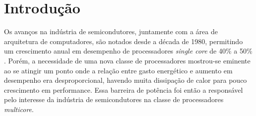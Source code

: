 
\newcommand{\multicore}{\textit{multicore}\xspace}
\newcommand{\chip}{\textit{chip}\xspace}
\newcommand{\chips}{\textit{chips}\xspace}
\newcommand{\singlecore}{\textit{single core}\xspace}
\newcommand{\tradeoff}{\textit{trade-off}\xspace}
\newcommand{\exascale}{\textit{Exascale}\xspace}
\newcommand{\greencomputing}{\textit{Green Computing}\xspace}  
\newcommand{\ranking}{\textit{ranking}\xspace}
\newcommand{\benchs}{\textit{benchmarks}\xspace}
\newcommand{\etal}{\textit{et al}.\xspace}
\newcommand{\thread}{\textit{thread}\xspace}
\newcommand{\threads}{\textit{threads}\xspace}
\newcommand{\cache}{\textit{cache}\xspace}
\newcommand{\caches}{\textit{caches}\xspace}
\newcommand{\byte}{\textit{byte}\xspace}
\newcommand{\bytes}{\textit{bytes}\xspace}
\newcommand{\transistor}{\textit{transistor}\xspace}
\newcommand{\transistors}{\textit{transistors}\xspace}
\newcommand{\hardware}{\textit{hardware}\xspace}
\newcommand{\cluster}{\textit{cluster}\xspace}
\newcommand{\clusters}{\textit{clusters}\xspace}
\newcommand{\kernel}{\textit{kernel}\xspace}
\newcommand{\kernels}{\textit{kernels}\xspace}
\newcommand{\offset}{\textit{offset}\xspace}
\newcommand{\offsets}{\textit{offsets}\xspace}
\newcommand{\master}{\textit{master}\xspace}
\newcommand{\masters}{\textit{masters}\xspace}
\newcommand{\slave}{\textit{slave}\xspace}
\newcommand{\slaves}{\textit{slaves}\xspace}

\chapter{Introdução}
\label{ch:introdução}

Os avanços na indústria de semicondutores, juntamente com a área de arquitetura de computadores, são notados desde a década de 1980, permitindo um crescimento anual em desempenho de processadores \singlecore de 40\% a 50\% \cite{Larus2008}. Porém, a necessidade de uma nova classe de processadores mostrou-se eminente ao se atingir um ponto onde a relação entre gasto energético e aumento em desempenho era desproporcional, havendo muita dissipação de calor para pouco crescimento em performance. Essa barreira de potência foi então a responsável pelo interesse da indústria de semicondutores na classe de processadores \multicore. 

